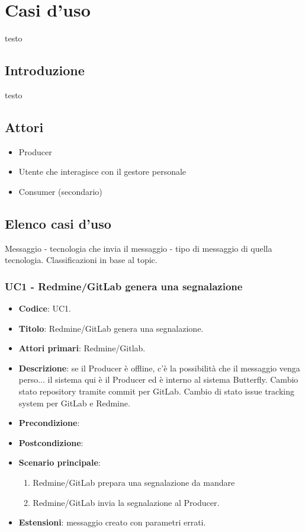 \newpage
\section{Casi d'uso}
testo

	\subsection{Introduzione}
	testo
	
	\subsection{Attori}
	\begin{itemize}
		\item Producer
		\item Utente che interagisce con il gestore personale
		\item Consumer (secondario)
	\end{itemize}
	
	\subsection{Elenco casi d'uso}
	Messaggio - tecnologia che invia il messaggio - tipo di messaggio di quella tecnologia.
	Classificazioni in base al topic.




\subsubsection{UC1 - Redmine/GitLab genera una segnalazione}
	\begin{itemize}
		\item \textbf{Codice}: UC1.
		\item \textbf{Titolo}: Redmine/GitLab genera una segnalazione.
		\item \textbf{Attori primari}: Redmine/Gitlab.
		\item \textbf{Descrizione}: se il Producer è offline, c'è la possibilità che il messaggio venga perso... il sistema qui è il Producer ed è interno al sistema Butterfly. Cambio stato repository tramite commit per GitLab. Cambio di stato issue tracking system per GitLab e Redmine.
		\item \textbf{Precondizione}:
		\item \textbf{Postcondizione}:
		\item \textbf{Scenario principale}: 
		\begin{enumerate}
			\item Redmine/GitLab prepara una segnalazione da mandare
			\item Redmine/GitLab invia la segnalazione al Producer.
		\end{enumerate}
		\item \textbf{Estensioni}: messaggio creato con parametri errati.
	\end{itemize}

